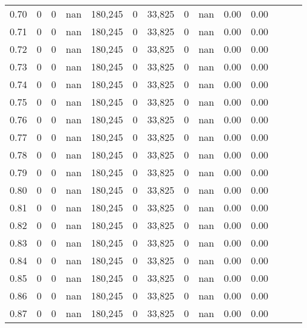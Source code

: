 \begin{tabular}{rrrrrrrrrrrrrr}
0.70 &        0 &       0 &   nan &  180,245 &        0 &  33,825 &       0 &   nan &  0.00 &      0.00 \\
0.71 &        0 &       0 &   nan &  180,245 &        0 &  33,825 &       0 &   nan &  0.00 &      0.00 \\
0.72 &        0 &       0 &   nan &  180,245 &        0 &  33,825 &       0 &   nan &  0.00 &      0.00 \\
0.73 &        0 &       0 &   nan &  180,245 &        0 &  33,825 &       0 &   nan &  0.00 &      0.00 \\
0.74 &        0 &       0 &   nan &  180,245 &        0 &  33,825 &       0 &   nan &  0.00 &      0.00 \\
0.75 &        0 &       0 &   nan &  180,245 &        0 &  33,825 &       0 &   nan &  0.00 &      0.00 \\
0.76 &        0 &       0 &   nan &  180,245 &        0 &  33,825 &       0 &   nan &  0.00 &      0.00 \\
0.77 &        0 &       0 &   nan &  180,245 &        0 &  33,825 &       0 &   nan &  0.00 &      0.00 \\
0.78 &        0 &       0 &   nan &  180,245 &        0 &  33,825 &       0 &   nan &  0.00 &      0.00 \\
0.79 &        0 &       0 &   nan &  180,245 &        0 &  33,825 &       0 &   nan &  0.00 &      0.00 \\
0.80 &        0 &       0 &   nan &  180,245 &        0 &  33,825 &       0 &   nan &  0.00 &      0.00 \\
0.81 &        0 &       0 &   nan &  180,245 &        0 &  33,825 &       0 &   nan &  0.00 &      0.00 \\
0.82 &        0 &       0 &   nan &  180,245 &        0 &  33,825 &       0 &   nan &  0.00 &      0.00 \\
0.83 &        0 &       0 &   nan &  180,245 &        0 &  33,825 &       0 &   nan &  0.00 &      0.00 \\
0.84 &        0 &       0 &   nan &  180,245 &        0 &  33,825 &       0 &   nan &  0.00 &      0.00 \\
0.85 &        0 &       0 &   nan &  180,245 &        0 &  33,825 &       0 &   nan &  0.00 &      0.00 \\
0.86 &        0 &       0 &   nan &  180,245 &        0 &  33,825 &       0 &   nan &  0.00 &      0.00 \\
0.87 &        0 &       0 &   nan &  180,245 &        0 &  33,825 &       0 &   nan &  0.00 &      0.00 \\

\end{tabular}

